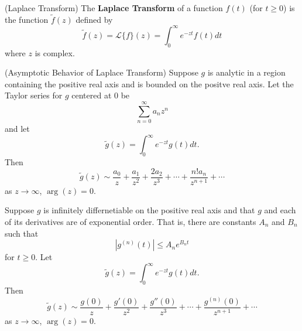 \begin{defn}{(Laplace Transform)}
The \textbf{Laplace Transform} of a function $f(t)$ (for $t\geq
0$) is the function $\widetilde{f}(z)$ defined by
\begin{equation}%
\widetilde{f}(z) = \mathcal{L}\{f\}(z) = \int^{\infty}_{0}e^{-zt}f(t)dt
\end{equation}
where $z$ is complex.
\end{defn}
\begin{prop}{(Asymptotic Behavior of Laplace Transform) }%
Suppose $g$ is analytic in a region containing the positive real
axis and is bounded on the positve real axis. Let the Taylor
series for $g$ centered at 0 be
\begin{equation}%
\sum^{\infty}_{n=0} a_{n}z^{n}
\end{equation}
and let
\begin{equation}%
\widetilde{g}(z) = \int^{\infty}_{0}e^{-zt}g(t)dt.
\end{equation}
Then
\begin{equation}%
\widetilde{g}(z)\sim \frac{a_0}{z}+\frac{a_1}{z^2}+\frac{2a_2}{z^3}+\cdots+\frac{n!a_n}{z^{n+1}}+\cdots
\end{equation}
as $z\to\infty$, $\operatorname{arg}(z)=0$.
\end{prop}
\begin{prop}%
Suppose $g$ is infinitely differnetiable on the positive real
axis and that $g$ and each of its derivatives are of exponential
order. That is, there are constants $A_n$ and $B_n$ such that
\begin{equation}%
|g^{(n)}(t)|\leq A_{n}e^{B_{n}t}
\end{equation}
for $t\geq0$. Let
\begin{equation}%
\widetilde{g}(z) = \int^{\infty}_{0}e^{-zt}g(t)dt.
\end{equation}
Then
\begin{equation}%
\widetilde{g}(z)\sim  \frac{g(0)}{z}+\frac{g'(0)}{z^2}+\frac{g''(0)}{z^3}+\cdots+\frac{g^{(n)}(0)}{z^{n+1}}+\cdots
\end{equation}
as $z\to\infty$, $\operatorname{arg}(z)=0$.
\end{prop}
